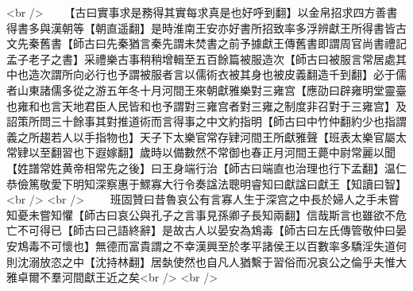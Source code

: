<br />
　　【古曰實事求是務得其實每求真是也好呼到翻】以金帛招求四方善書得書多與漢朝等【朝直遥翻】是時淮南王安亦好書所招致率多浮辨獻王所得書皆古文先秦舊書【師古曰先秦猶言秦先謂未焚書之前予據獻王傳舊書即謂周官尚書禮記孟子老子之書】采禮樂古事稍稍增輯至五百餘篇被服造次【師古曰被服言常居處其中也造次謂所向必行也予謂被服者言以儒術衣被其身也被皮義翻造千到翻】必于儒者山東諸儒多從之游五年冬十月河間王來朝獻雅樂對三雍宫【應劭曰辟雍明堂靈臺也雍和也言天地君臣人民皆和也予謂對三雍宫者對三雍之制度非召對于三雍宫】及詔策所問三十餘事其對推道術而言得事之中文約指明【師古曰中竹仲翻約少也指謂義之所趨若人以手指物也】天子下太樂官常存肄河間王所獻雅聲【班表太樂官屬太常肄以至翻習也下遐嫁翻】歲時以備數然不常御也春正月河間王薨中尉常麗以聞【姓譜常姓黄帝相常先之後】曰王身端行治【師古曰端直也治理也行下孟翻】温仁恭儉篤敬愛下明知深察惠于鰥寡大行令奏諡法聰明睿知曰獻諡曰獻王【知讀曰智】<br />
<br />
　　班固贊曰昔魯哀公有言寡人生于深宫之中長於婦人之手未嘗知憂未嘗知懼【師古曰哀公與孔子之言事見孫卿子長知兩翻】信哉斯言也雖欲不危亡不可得已【師古曰己語終辭】是故古人以晏安為鴆毒【師古曰左氏傳管敬仲曰晏安鴆毒不可懷也】無德而富貴謂之不幸漢興至於孝平諸侯王以百數率多驕淫失道何則沈溺放恣之中【沈持林翻】居埶使然也自凡人猶繫于習俗而况哀公之倫乎夫惟大雅卓爾不羣河間獻王近之矣<br />
<br />
